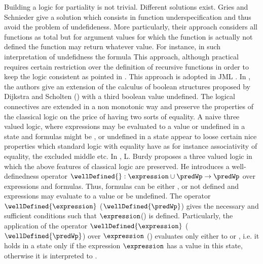 Building a logic for partiality is not trivial. Different solutions exist. 
Gries and Schnieder \cite{gries95avoiding} give a solution which consists in function 
underspecification  and thus  avoid the problem of undefideness. 
 More particularly, their approach considers all functions as total but for argument values for which the function is actually 
not defined the function may return whatever value. 
For instance, in such interpretation of undefidness the formula 
This approach, although practical requires certain restriction over the definition 
of recursive functions in order to keep the logic consistent as pointed in \cite{J95PFL}.
This approach is adopted in JML \cite{JMLRefMan}.
 In  \cite{schieder99adapting}, the authors give 
  an extension  of the calculus of boolean structures proposed by Dijkstra and Scholten (\cite{WPCDS}) with a  third boolean value 
undefined.  The logical connectives are extended in a non monotonic way and preserve the properties of the classical logic
on the price  of having two sorts of equality.
A naive three valued logic, where expressions may be evaluated to a value or  undefined  in a state and
 formulas might be \false{}, \true{} or undefined in a state appear to loose certain nice properties
 which standard logic with equality have
as for instance associativity of equality, the excluded middle \cite{gries95avoiding} etc. 
In \cite{burdy98treatment}, L. Burdy proposes a three valued logic in which the above features of classical logic are preserved.
He introduces a well-definedness operator $\wellDefined{}: \expression \cup \predWp \rightarrow \predWp$
 over expressions and formulas. Thus, formulas can be either \true{}, \false{} or not defined and
expressions may evaluate to a value or be undefined. The operator  $\wellDefined{\expression}$ ($\wellDefined{\predWp}$) 
 gives the necessary and sufficient
 conditions such that $\expression$(\predWp ) is defined. 
 Particularly, the application of the operator   $\wellDefined{\expression}$  ($\wellDefined{\predWp}$) over $\expression$  (\predWp ) 
 evaluates only either to \true{} or \false{}, i.e.  it holds in a state only if the expression $\expression$ has  a value in this state, otherwise it is interpreted to \false{}.   
 
